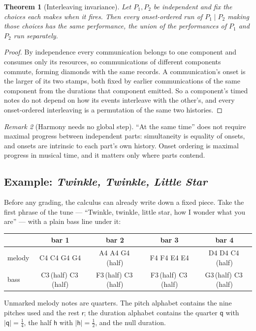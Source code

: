 \documentclass[11pt,a4paper]{article}
\theoremstyle{plain}
\newtheorem{theorem}{Theorem}[section]
\theoremstyle{definition}
\theoremstyle{remark}
\newtheorem{remark}[theorem]{Remark}
\newcommand{\len}[1]{|#1|}
\newcommand{\rest}{\mathsf{r}}
\begin{document}
\begin{theorem}[Interleaving invariance]\label{thm:interleave}
Let $P_1, P_2$ be independent and fix the choices each makes when it fires. Then
every onset-ordered run of $P_1 \mid P_2$ making those choices has the same
performance, the union of the performances of $P_1$ and $P_2$ run separately.
\end{theorem}
\begin{proof}
By independence every communication belongs to one component and consumes only
its resources, so communications of different components commute, forming
diamonds with the same records. A communication's onset is the larger of its two
stamps, both fixed by earlier communications of the same component from the
durations that component emitted. So a component's timed notes do not depend on how its events
interleave with the other's, and every onset-ordered interleaving is a
permutation of the same two histories.
\end{proof}

\begin{remark}[Harmony needs no global step]\label{rem:maxprog}
``At the same time'' does not require maximal progress between independent
parts: simultaneity is equality of onsets, and onsets are intrinsic to each
part's own history. Onset ordering is maximal progress in musical time, and it
matters only where parts contend.
\end{remark}

\subsection{Example: \emph{Twinkle, Twinkle, Little Star}}\label{ssec:twinkle}

Before any grading, the calculus can already write down a fixed piece. Take the
first phrase of the tune --- ``Twinkle, twinkle, little star, how I wonder what
you are'' --- with a plain bass line under it:
\begin{center}
\begin{tabular}{@{}lcccc@{}}
\toprule
& bar 1 & bar 2 & bar 3 & bar 4 \\
\midrule
melody & C4 C4 G4 G4 & A4 A4 G4\,(half) & F4 F4 E4 E4 & D4 D4 C4\,(half) \\
bass   & C3\,(half) C3\,(half) & F3\,(half) C3\,(half) & F3\,(half) C3\,(half) & G3\,(half) C3\,(half) \\
\bottomrule
\end{tabular}
\end{center}
Unmarked melody notes are quarters. The pitch alphabet contains the nine pitches
used and the rest $\rest$; the duration alphabet contains the quarter
$\mathsf{q}$ with $\len{\mathsf{q}} = \tfrac14$, the half $\mathsf{h}$ with
$\len{\mathsf{h}} = \tfrac12$, and the null duration.
\end{document}
